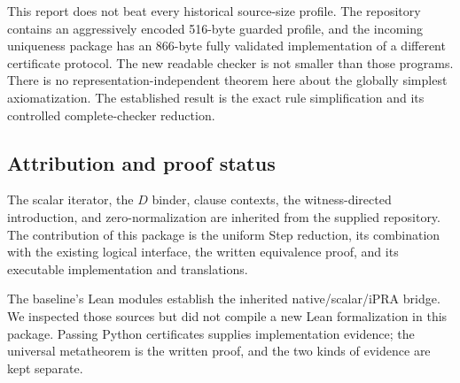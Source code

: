 \documentclass[11pt,letterpaper]{article}
\theoremstyle{definition}
\begin{document}
This report does not beat every historical source-size profile.
The repository contains an aggressively encoded 516-byte guarded
profile, and the incoming uniqueness package has an 866-byte fully
validated implementation of a different certificate protocol. The new
readable checker is not smaller than those programs. There is no
representation-independent theorem here about the globally simplest
axiomatization. The established result is the exact rule simplification
and its controlled complete-checker reduction.

\subsection{Attribution and proof status}

The scalar iterator, the \(D\) binder, clause contexts, the
witness-directed introduction, and zero-normalization are inherited
from the supplied repository. The contribution of this package is the
uniform Step reduction, its combination with the existing logical
interface, the written equivalence proof, and its executable
implementation and translations.

The baseline's Lean modules establish the inherited native/scalar/iPRA
bridge. We inspected those sources but did not compile a new Lean
formalization in this package. Passing Python certificates supplies
implementation evidence; the universal metatheorem is the written
proof, and the two kinds of evidence are kept separate.
\end{document}
